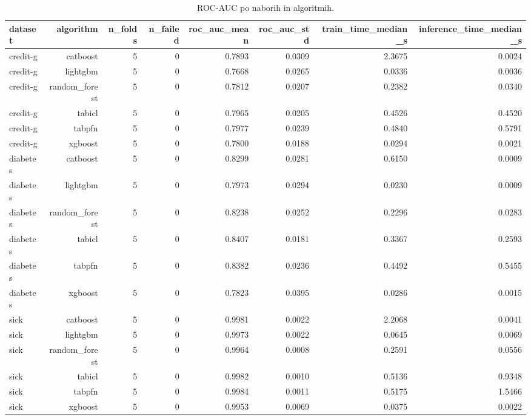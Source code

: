 \begin{table}[htbp]
\centering
\caption{ROC-AUC po naborih in algoritmih.}
\label{tab:per-dataset}
\begin{tabular}{lrrrrrrr}
\hline
dataset & algorithm & n\_folds & n\_failed & roc\_auc\_mean & roc\_auc\_std & train\_time\_median\_s & inference\_time\_median\_s \\
\hline
credit-g & catboost & 5 & 0 & 0.7893 & 0.0309 & 2.3675 & 0.0024 \\
credit-g & lightgbm & 5 & 0 & 0.7668 & 0.0265 & 0.0336 & 0.0036 \\
credit-g & random\_forest & 5 & 0 & 0.7812 & 0.0207 & 0.2382 & 0.0340 \\
credit-g & tabicl & 5 & 0 & 0.7965 & 0.0205 & 0.4526 & 0.4520 \\
credit-g & tabpfn & 5 & 0 & 0.7977 & 0.0239 & 0.4840 & 0.5791 \\
credit-g & xgboost & 5 & 0 & 0.7800 & 0.0188 & 0.0294 & 0.0021 \\
diabetes & catboost & 5 & 0 & 0.8299 & 0.0281 & 0.6150 & 0.0009 \\
diabetes & lightgbm & 5 & 0 & 0.7973 & 0.0294 & 0.0230 & 0.0009 \\
diabetes & random\_forest & 5 & 0 & 0.8238 & 0.0252 & 0.2296 & 0.0283 \\
diabetes & tabicl & 5 & 0 & 0.8407 & 0.0181 & 0.3367 & 0.2593 \\
diabetes & tabpfn & 5 & 0 & 0.8382 & 0.0236 & 0.4492 & 0.5455 \\
diabetes & xgboost & 5 & 0 & 0.7823 & 0.0395 & 0.0286 & 0.0015 \\
sick & catboost & 5 & 0 & 0.9981 & 0.0022 & 2.2068 & 0.0041 \\
sick & lightgbm & 5 & 0 & 0.9973 & 0.0022 & 0.0645 & 0.0069 \\
sick & random\_forest & 5 & 0 & 0.9964 & 0.0008 & 0.2591 & 0.0556 \\
sick & tabicl & 5 & 0 & 0.9982 & 0.0010 & 0.5136 & 0.9348 \\
sick & tabpfn & 5 & 0 & 0.9984 & 0.0011 & 0.5175 & 1.5466 \\
sick & xgboost & 5 & 0 & 0.9953 & 0.0069 & 0.0375 & 0.0022 \\
\hline
\end{tabular}
\end{table}
